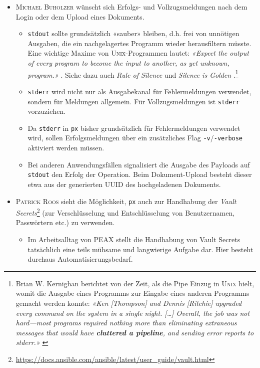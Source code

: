 \begin{itemize}
    \item \textsc{Michael Buholzer} wünscht sich Erfolgs- und Vollzugsmeldungen nach dem Login oder dem Upload eines Dokuments.
    \begin{itemize}
        \item \texttt{stdout} sollte grundsätzlich «sauber» bleiben, d.h. frei von unnötigen Ausgaben, die ein nachgelagertes Programm wieder herausfiltern müsste. Eine wichtige Maxime von \textsc{Unix}-Programmen lautet: \textit{«Expect the output of every program to become the input to another, as yet unknown, program.»} \cite[S. 3]{unixtimesharing}. Siehe dazu auch \textit{Rule of Silence} \cite[S. 20]{unixart} und \textit{Silence is Golden} \cite[S. 111]{unixphil}.\footnote{Brian W. Kernighan berichtet von der Zeit, als die Pipe Einzug in \textsc{Unix} hielt, womit die Ausgabe eines Programms zur Eingabe eines anderen Programms gemacht werden konnte: \textit{«Ken [Thompson] and Dennis [Ritchie] upgraded every command on the system in a single night. […] Overall, the job was not hard—most programs required nothing more than eliminating extraneous messages that would have \textbf{cluttered a pipeline}, and sending error reports to stderr.»} \cite[S. 69]{unix-history-memoir}}
        \item \texttt{stderr} wird nicht nur als Ausgabekanal für Fehlermeldungen verwendet, sondern für Meldungen allgemein. Für Vollzugsmeldungen ist \texttt{stderr} vorzuziehen.
        \item Da \texttt{stderr} in \texttt{px} bisher grundsätzlich für Fehlermeldungen verwendet wird, sollen Erfolgsmeldungen über ein zusätzliches Flag \texttt{-v}/\texttt{-verbose} aktiviert werden müssen.
        \item Bei anderen Anwendungsfällen signalisiert die Ausgabe des Payloads auf \texttt{std\-out} den Erfolg der Operation. Beim Dokument-Upload besteht dieser etwa aus der generierten UUID des hochgeladenen Dokuments.
    \end{itemize}
\item \textsc{Patrick Roos} sieht die Möglichkeit, \texttt{px} auch zur Handhabung der \textit{Vault Secrets}\footnote{\url{https://docs.ansible.com/ansible/latest/user_guide/vault.html}} (zur Verschlüsselung und Entschlüsselung von Benutzernamen, Passwörtern etc.) zu verwenden.
    \begin{itemize}
        \item Im Arbeitsalltag von PEAX stellt die Handhabung von Vault Secrets tatsächlich eine teils mühsame und langwierige Aufgabe dar. Hier besteht durchaus Automatisierungsbedarf.

\end{itemize}
\end{itemize}
